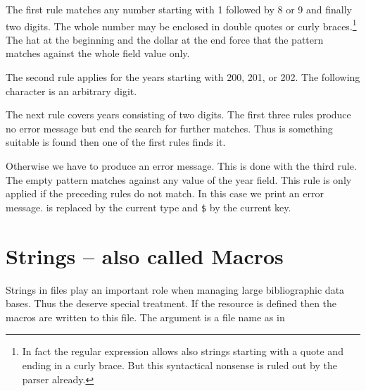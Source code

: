 \documentclass[11pt,a4paper]{scrbook}
\begin{document}
The first rule matches any number starting with 1 followed by 8 or 9 and
finally two digits. The whole number may be enclosed in double quotes or curly
braces.\footnote{In fact the regular expression allows also strings starting
  with a quote and ending in a curly brace. But this syntactical nonsense is
  ruled out by the parser already.} The hat at the beginning and the dollar at
the end force that the pattern matches against the whole field value only.

The second rule applies for the years starting with 200, 201, or 202. The
following character is an arbitrary digit.

The next rule covers years consisting of two digits. The first three rules
produce no error message but end the search for further matches. Thus is
something suitable is found then one of the first rules finds it.

Otherwise we have to produce an error message. This is done with the third
rule. The empty pattern matches against any value of the year field. This rule
is only applied if the preceding rules do not match. In this case we print an
error message. \texttt{\BS@} is replaced by the current type and
\texttt{\BS\$} by the current key.


\begin{Summary}
\end{Summary}


\section{Strings -- also called Macros}\label{sec:macros}

Strings in \BibTeX{} files play an important role when managing large
bibliographic data bases. Thus the deserve special treatment. If the resource
 is defined then the macros are written to this file. The
argument is a file name as in

\begin{Resources}
\end{Resources}
\end{document}
